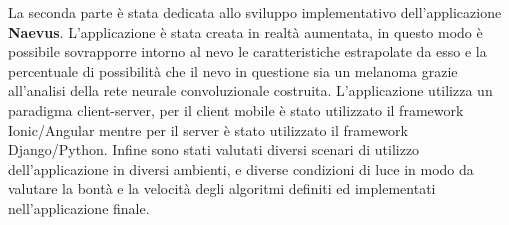 La seconda parte è stata dedicata allo sviluppo implementativo dell'applicazione \textbf{Naevus}.
L'applicazione è stata creata in realtà aumentata, in questo modo è possibile sovrapporre intorno al nevo le caratteristiche estrapolate da esso e la percentuale di possibilità che il nevo in questione sia un melanoma grazie all'analisi della rete neurale convoluzionale costruita.
\newline
L'applicazione utilizza un paradigma client-server, per il client mobile è stato utilizzato il framework Ionic/Angular mentre per il server è stato utilizzato il framework Django/Python.
\newline
Infine sono stati valutati diversi scenari di utilizzo dell'applicazione in diversi ambienti, e diverse condizioni di luce in modo da valutare la bontà e la velocità degli algoritmi definiti ed implementati nell'applicazione finale.
\newline

